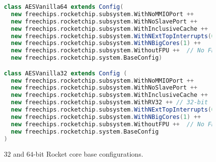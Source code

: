 
\begin{figure}[h!]
\begin{lstlisting}[language=scala]
class AESVanilla64 extends Config(
  new freechips.rocketchip.subsystem.WithNoMMIOPort ++
  new freechips.rocketchip.subsystem.WithNoSlavePort ++
  new freechips.rocketchip.subsystem.WithInclusiveCache ++
  new freechips.rocketchip.subsystem.WithNExtTopInterrupts(0) ++
  new freechips.rocketchip.subsystem.WithNBigCores(1) ++
  new freechips.rocketchip.subsystem.WithoutFPU ++  // No FPU
  new freechips.rocketchip.system.BaseConfig)

class AESVanilla32 extends Config (
  new freechips.rocketchip.subsystem.WithNoMMIOPort ++
  new freechips.rocketchip.subsystem.WithNoSlavePort ++
  new freechips.rocketchip.subsystem.WithInclusiveCache ++
  new freechips.rocketchip.subsystem.WithRV32 ++ // 32-bit
  new freechips.rocketchip.subsystem.WithNExtTopInterrupts(0) ++
  new freechips.rocketchip.subsystem.WithNBigCores(1) ++
  new freechips.rocketchip.subsystem.WithoutFPU ++  // No FPU
  new freechips.rocketchip.system.BaseConfig
)
\end{lstlisting}
\caption{$32$ and $64$-bit Rocket core base configurations.}
\label{fig:rocket:cfg}
\end{figure}
